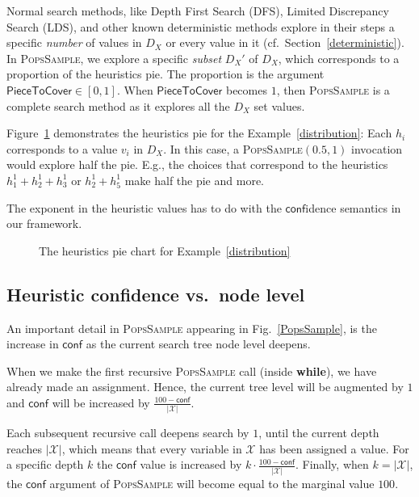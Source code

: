 \documentclass{ws-ijait}
\begin{document}
Normal search methods, like Depth First Search (DFS),
Limited Discrepancy Search (LDS), and other known
deterministic methods explore in their steps a specific
\emph{number} of values in $D_X$ or every value in it (cf.\ 
Section~\ref{deterministic}). In \textsc{PopsSample}, we
explore a specific \emph{subset} $D_X'$ of $D_X$, which
corresponds to a proportion of the heuristics pie. The
proportion is the argument $\mathsf{PieceToCover} \in
[0,1]$. When $\mathsf{PieceToCover}$ becomes $1$, then
\textsc{PopsSample} is a complete search method as it
explores all the $D_X$ set values.
\begin{example}
  Figure~\ref{piechart} demonstrates the heuristics pie for
  the Example~\ref{distribution}: Each $h_i$ corresponds to
  a value $v_i$ in $D_X$. In this case, a
  \textsc{PopsSample}$(0.5,1)$ invocation would explore half
  the pie. E.g., the choices that correspond to the
  heuristics $h_1^1 + h_2^1 + h_3^1$ or $h_2^1 + h_5^1$ make
  half the pie and more.
\end{example}
The exponent in the heuristic values has to do with the
$\mathsf{conf}$idence semantics in our framework.

\begin{figure}
  \centering
  
  \caption{The heuristics pie chart for
           Example~\ref{distribution}\label{piechart}}
\end{figure}

\subsection{Heuristic confidence vs.\ node level}

An important detail in \textsc{PopsSample} appearing in
Fig.~\ref{PopsSample}, is the increase in $\mathsf{conf}$ as
the current search tree node level deepens.

When we make the first recursive \textsc{PopsSample} call
(inside \textbf{while}), we have already made an assignment.
Hence, the current tree level will be augmented by $1$ and
$\mathsf{conf}$ will be increased by $\frac{100 -
\mathsf{conf}}{|\mathscr{X}|}$.

Each subsequent recursive call deepens search by $1$, until
the current depth reaches $|\mathscr{X}|$, which means that
every variable in $\mathscr{X}$ has been assigned a value.
For a specific depth $k$ the $\mathsf{conf}$ value is
increased by $k \cdot \frac{100 -
\mathsf{conf}}{|\mathscr{X}|}$. Finally, when $k =
|\mathscr{X}|$, the $\mathsf{conf}$ argument of
\textsc{PopsSample} will become equal to the marginal value
$100$.
\end{document}
